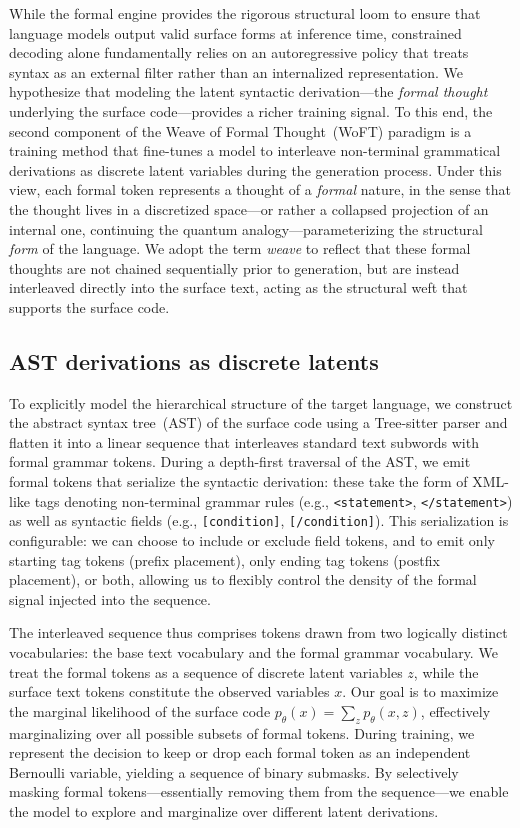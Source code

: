\documentclass[11pt]{article}
\theoremstyle{plain}
\theoremstyle{definition}
\begin{document}
While the formal engine provides the rigorous structural loom to ensure that
language models output valid surface forms at inference time, constrained
decoding alone fundamentally relies on an autoregressive policy that treats
syntax as an external filter rather than an internalized representation. We
hypothesize that modeling the latent syntactic derivation---the \emph{formal
thought} underlying the surface code---provides a richer training signal. To
this end, the second component of the Weave of Formal Thought~(WoFT) paradigm is
a training method that fine-tunes a model to interleave non-terminal grammatical
derivations as discrete latent variables during the generation process. Under
this view, each formal token represents a thought of a \emph{formal} nature, in
the sense that the thought lives in a discretized space---or rather a collapsed
projection of an internal one, continuing the quantum analogy---parameterizing
the structural \emph{form} of the language. We adopt the term \emph{weave} to
reflect that these formal thoughts are not chained sequentially prior to
generation, but are instead interleaved directly into the surface text, acting
as the structural weft that supports the surface code.

\subsection{AST derivations as discrete latents}

To explicitly model the hierarchical structure of the target language, we
construct the abstract syntax tree~(AST) of the surface code using a Tree-sitter
parser and flatten it into a linear sequence that interleaves standard text
subwords with formal grammar tokens. During a depth-first traversal of the AST,
we emit formal tokens that serialize the syntactic derivation: these take the
form of XML-like tags denoting non-terminal grammar rules (e.g.,
\texttt{<statement>}, \texttt{</statement>}) as well as syntactic fields (e.g.,
\texttt{[condition]}, \texttt{[/condition]}). This serialization is
configurable: we can choose to include or exclude field tokens, and to emit only
starting tag tokens (prefix placement), only ending tag tokens (postfix
placement), or both, allowing us to flexibly control the density of the formal
signal injected into the sequence.

The interleaved sequence thus comprises tokens drawn from two logically distinct
vocabularies: the base text vocabulary and the formal grammar vocabulary. We
treat the formal tokens as a sequence of discrete latent variables \( z \),
while the surface text tokens constitute the observed variables \( x \). Our
goal is to maximize the marginal likelihood of the surface code \( p_{\theta}(x)
= \sum_{z} p_{\theta}(x, z) \), effectively marginalizing over all possible
subsets of formal tokens. During training, we represent the decision to keep or
drop each formal token as an independent Bernoulli variable, yielding a sequence
of binary submasks. By selectively masking formal tokens---essentially removing
them from the sequence---we enable the model to explore and marginalize over
different latent derivations.
\end{document}
